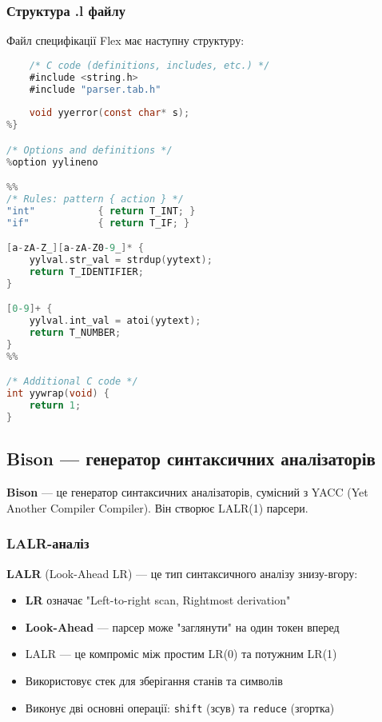 \documentclass[12pt,a4paper]{article}
\begin{document}
\subsubsection{Структура .l файлу}

Файл специфікації Flex має наступну структуру:

\begin{lstlisting}[language=C]
%{
    /* C code (definitions, includes, etc.) */
    #include <string.h>
    #include "parser.tab.h"
    
    void yyerror(const char* s);
%}

/* Options and definitions */
%option yylineno

%%
/* Rules: pattern { action } */
"int"           { return T_INT; }
"if"            { return T_IF; }

[a-zA-Z_][a-zA-Z0-9_]* {
    yylval.str_val = strdup(yytext);
    return T_IDENTIFIER;
}

[0-9]+ {
    yylval.int_val = atoi(yytext);
    return T_NUMBER;
}
%%

/* Additional C code */
int yywrap(void) {
    return 1;
}
\end{lstlisting}

\subsection{Bison --- генератор синтаксичних аналізаторів}

\textbf{Bison} --- це генератор синтаксичних аналізаторів, сумісний з YACC (Yet Another Compiler Compiler). Він створює LALR(1) парсери.

\subsubsection{LALR-аналіз}

\textbf{LALR} (Look-Ahead LR) --- це тип синтаксичного аналізу знизу-вгору:

\begin{itemize}
    \item \textbf{LR} означає "Left-to-right scan, Rightmost derivation"
    \item \textbf{Look-Ahead} --- парсер може "заглянути" на один токен вперед
    \item LALR --- це компроміс між простим LR(0) та потужним LR(1)
    \item Використовує стек для зберігання станів та символів
    \item Виконує дві основні операції: \texttt{shift} (зсув) та \texttt{reduce} (згортка)
\end{itemize}
\end{document}
